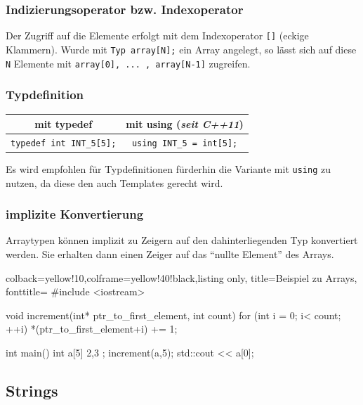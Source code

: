 \documentclass[a4paper]{report}
\begin{document}
\subsubsection{Indizierungsoperator bzw. Indexoperator}

Der Zugriff auf die Elemente erfolgt mit dem Indexoperator \texttt{[]} (eckige Klammern). Wurde mit \texttt{Typ array[N];} ein Array angelegt, so lässt sich auf diese \texttt{N} Elemente mit \texttt{array[0], ... , array[N-1]} zugreifen.

\subsubsection{Typdefinition}
\begin{center}
\begin{tabular}{|c|c|} \hline
	\textbf{mit typedef} & \textbf{mit using {\small (\textit{seit C++11})}} \\ \hline
	\texttt{typedef int INT\_5[5];} & \texttt{using INT\_5 = int[5];} \\ \hline
\end{tabular}
\end{center}

Es wird empfohlen für Typdefinitionen fürderhin die Variante mit \texttt{using} zu nutzen, da diese den auch Templates gerecht wird. 

\subsubsection{implizite Konvertierung}

Arraytypen können implizit zu Zeigern auf den dahinterliegenden Typ konvertiert werden. Sie erhalten dann einen Zeiger auf das "`nullte Element"' des Arrays.

\begin{tcblisting}{colback=yellow!10,colframe=yellow!40!black,listing only,
		title=Beispiel zu Arrays, fonttitle=\bfseries}
	#include <iostream>
	
	void increment(int* ptr_to_first_element, int count){
		for (int i = 0; i< count; ++i){
			*(ptr_to_first_element+i) += 1;
		}	
	}
	
	int main(){
		int a[5] { 2,3 };
		increment(a,5);
		std::cout << a[0];
	}
\end{tcblisting}

\subsection{Strings}
\end{document}
